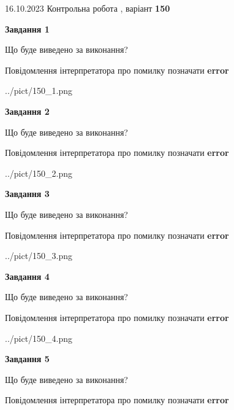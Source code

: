 \documentclass[12pt, ukrainian]{article}
\begin{document}
{\Large{16.10.2023 Контрольна робота , варіант  \No \textbf { 150 }\par}}
{
\begin {large}
{\begin {center}\textbf{Завдання 1}\end {center}}\par
Що буде виведено за виконання? \par
Повідомлення інтерпретатора про помилку позначати \textbf{error}

\begin{center}
	{../pict/150_1.png}
\end{center}
\newpage

{\begin {center}\textbf{Завдання 2}\end {center}}\par
Що буде виведено за виконання? \par
Повідомлення інтерпретатора про помилку позначати \textbf{error}

\begin{center}
	{../pict/150_2.png}
\end{center}
\newpage

{\begin {center}\textbf{Завдання 3}\end {center}}\par
Що буде виведено за виконання? \par
Повідомлення інтерпретатора про помилку позначати \textbf{error}

\begin{center}
	{../pict/150_3.png}
\end{center}
\newpage

{\begin {center}\textbf{Завдання 4}\end {center}}\par
Що буде виведено за виконання? \par
Повідомлення інтерпретатора про помилку позначати \textbf{error}

\begin{center}
	{../pict/150_4.png}
\end{center}
\newpage

{\begin {center}\textbf{Завдання 5}\end {center}}\par
Що буде виведено за виконання? \par
Повідомлення інтерпретатора про помилку позначати \textbf{error}


\end{large}}
\end{document}
